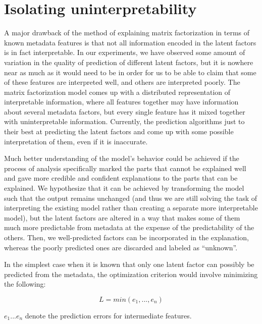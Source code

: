 \section{Isolating uninterpretability}

A major drawback of the method of explaining matrix factorization in terms of
known metadata features is that not all information encoded in the latent
factors is in fact interpretable. In our experiments, we have observed some
amount of variation in the quality of prediction of different latent factors,
but it is nowhere near as much as it would need to be in order for us to be able
to claim that some of these features are interpreted well, and others are
interpreted poorly. The matrix factorization model comes up with a distributed
representation of interpretable information, where all features together may
have information about several metadata factors, but every single feature has it
mixed together with uninterpretable information. Currently, the prediction
algorithms just to their best at predicting the latent factors and come up with
some possible interpretation of them, even if it is inaccurate.

Much better understanding of the model's behavior could be achieved if the
process of analysis specifically marked the parts that cannot be explained well
and gave more credible and confident explanations to the parts that can be
explained. We hypothesize that it can be achieved by transforming the model such
that the output remains unchanged (and thus we are still solving the task of
interpreting the existing model rather than creating a separate more
interpretable model), but the latent factors are altered in a way that makes
some of them much more predictable from metadata at the expense of the
predictability of the others. Then, we well-predicted factors can be
incorporated in the explanation, whereas the poorly predicted ones are discarded
and labeled as ``unknown''.

In the simplest case when it is known that only one latent factor can possibly be
predicted from the metadata, the optimization criterion would involve minimizing
the following:

\begin{equation}
L = min(e_1, ..., e_n)
\end{equation}

$e_1 ... e_n$ denote the prediction errors for intermediate features. 

